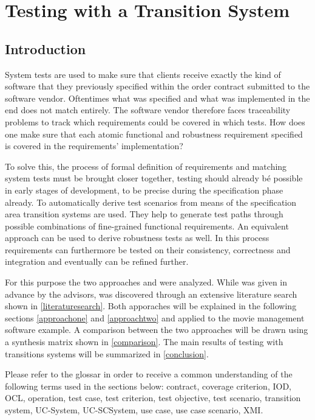\chapter{Testing with a Transition System}

\section{Introduction}

System tests are used to make sure that clients receive exactly the kind of software that they previously specified within the order contract submitted to the software vendor. Oftentimes what was specified and what was implemented in the end does not match entirely. The software vendor therefore faces traceability problems to track which requirements could be covered in which tests. How does one make sure that each atomic functional and robustness requirement specified is covered in the requirements' implementation?

To solve this, the process of formal definition of requirements and matching system tests must be brought closer together, testing should already bé possible in early stages of development, to be precise during the specification phase already. To automatically derive test scenarios from means of the specification area transition systems are used. They help to generate test paths through possible combinations of fine-grained functional requirements. An equivalent approach can be used to derive robustness tests as well. In this process requirements can furthermore be tested on their consistency, correctness and integration and eventually can be refined further.

For this purpose the two approaches \cite{ClementineNebut2006} and \cite{NajlaRaza2007} were analyzed. While \cite{ClementineNebut2006} was given in advance by the advisors, \cite{NajlaRaza2007} was discovered through an extensive literature search shown in \autoref{literaturesearch}. Both apporaches will be explained in the following sections \ref{approachone} and \ref{approachtwo} and applied to the movie management software example. A comparison between the two approaches will be drawn using a synthesis matrix shown in \autoref{comparison}. The main results of testing with transitions systems will be summarized in \autoref{conclusion}. 

Please refer to the glossar in order to receive a common understanding of the following terms used in the sections below: contract, coverage criterion, IOD, OCL, operation, test case, test criterion, test objective, test scenario, transition system, UC-System, UC-SCSystem, use case, use case scenario, XMI.

